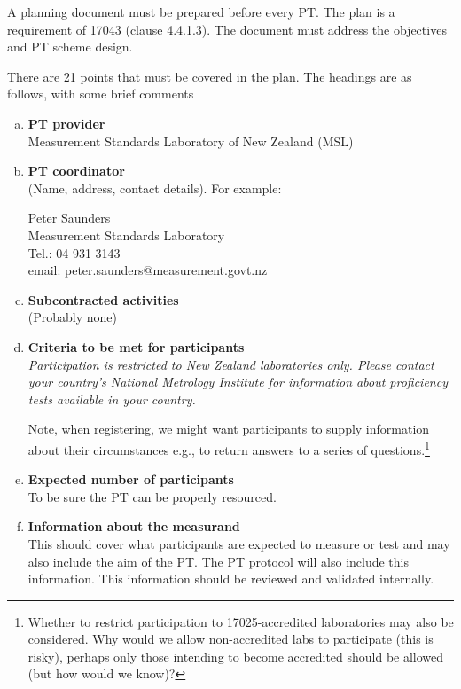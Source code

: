 A planning document must be prepared before every PT. The plan is a requirement of 17043 (clause 4.4.1.3).  The document must address the objectives and PT scheme design. 


There are 21 points that must be covered in the plan. The headings are as follows, with some brief comments  

\begin{enumerate}[a)]
\item	\textbf{PT provider} \\
Measurement Standards Laboratory of New Zealand (MSL)

\item	\textbf{PT coordinator} \\
(Name, address, contact details). For example:

Peter Saunders\\
Measurement Standards Laboratory\\
Tel.: 04 931 3143\\
email: peter.saunders@measurement.govt.nz

\item	\textbf{Subcontracted activities} \\
(Probably none)

\item	\textbf{Criteria to be met for participants} \\

\textit{Participation is restricted to New Zealand laboratories only.  Please contact your country's National Metrology Institute for information about proficiency tests available in your country.}

\vspace{\baselineskip}
Note, when registering, we might want participants to supply information about their circumstances  e.g., to return answers to a series of questions.\footnote{Whether to restrict participation to 17025-accredited laboratories may also be considered. Why would we allow non-accredited labs to participate (this is risky), perhaps only those intending to become accredited should be allowed (but how would we know)?}

\item	\textbf{Expected number of participants} \\
To be sure the PT can be properly resourced. 

\item	\textbf{Information about the measurand} \\ \label{l:measurands}%
This should cover what participants are expected to measure or test and may also include the aim of the PT. The PT protocol will also include this information.  This information should be reviewed and validated internally.


\end{enumerate}
